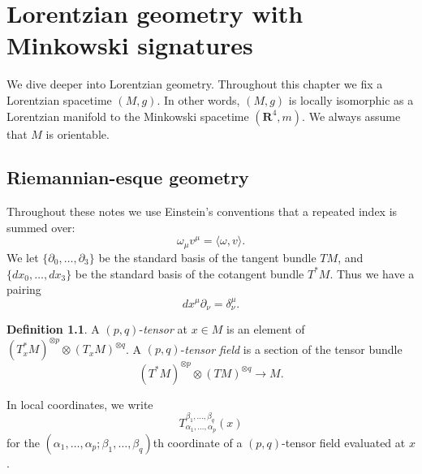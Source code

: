 \documentclass[12pt]{report}
\newcommand{\RR}{\mathbf{R}}
\newcommand{\dfn}[1]{\emph{#1}\index{#1}}
\theoremstyle{definition}
\newtheorem{definition}[theorem]{Definition}
\theoremstyle{remark}
\begin{document}
\chapter{Lorentzian geometry with Minkowski signatures}
We dive deeper into Lorentzian geometry. Throughout this chapter we fix a Lorentzian spacetime $(M, g)$. In other words, $(M, g)$ is locally isomorphic as a Lorentzian manifold to the Minkowski spacetime $(\RR^4, m)$. We always assume that $M$ is orientable.

\section{Riemannian-esque geometry}
Throughout these notes we use Einstein's conventions that a repeated index is summed over:
$$\omega_\mu v^\mu = \langle \omega, v\rangle.$$
We let $\{\partial_0, \dots, \partial_3\}$ be the standard basis of the tangent bundle $TM$, and $\{dx_0, \dots, dx_3\}$ be the standard basis of the cotangent bundle $T^*M$. Thus we have a pairing
$$dx^\mu \partial_\nu = \delta_\nu^\mu.$$

\begin{definition}
A $(p, q)$-\dfn{tensor} at $x \in M$ is an element of $(T_x^*M)^{\otimes p} \otimes (T_xM)^{\otimes q}$. A $(p, q)$-\dfn{tensor field} is a section of the tensor bundle $$(T^*M)^{\otimes p} \otimes (TM)^{\otimes q} \to M.$$
\end{definition}
In local coordinates, we write
$$T_{\alpha_1, \dots, \alpha_p}^{\beta_1, \dots, \beta_q}(x)$$
for the $(\alpha_1, \dots, \alpha_p; \beta_1, \dots, \beta_q)$th coordinate of a $(p, q)$-tensor field evaluated at $x$.
\end{document}
